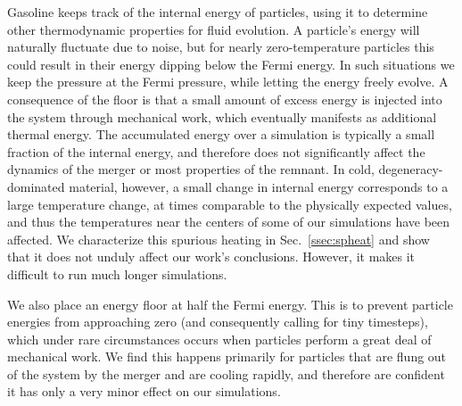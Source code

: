 Gasoline keeps track of the internal energy of particles, using it to determine other thermodynamic properties for fluid evolution.  A particle's energy will naturally fluctuate due to noise, but for nearly zero-temperature particles this could result in their energy dipping below the Fermi energy.  In such situations we keep the pressure at the Fermi pressure, while letting the energy freely evolve.  A consequence of the floor is that a small amount of excess energy is injected into the system through mechanical work, which eventually manifests as additional thermal energy.  The accumulated energy over a simulation is typically a small fraction of the internal energy, and therefore does not significantly affect the dynamics of the merger or most properties of the remnant.  In cold, degeneracy-dominated material, however, a small change in internal energy corresponds to a large temperature change, at times comparable to the physically expected values, and thus the temperatures near the centers of some of our simulations have been affected.  We characterize this spurious heating in Sec.~\ref{ssec:spheat} and show that it does not unduly affect our work's conclusions.  However, it makes it difficult to run much longer simulations.

We also place an energy floor at half the Fermi energy.  This is to prevent particle energies from approaching zero (and consequently calling for tiny timesteps), which under rare circumstances occurs when particles perform a great deal of mechanical work.  We find this happens primarily for particles that are flung out of the system by the merger and are cooling rapidly, and therefore are confident it has only a very minor effect on our simulations.



